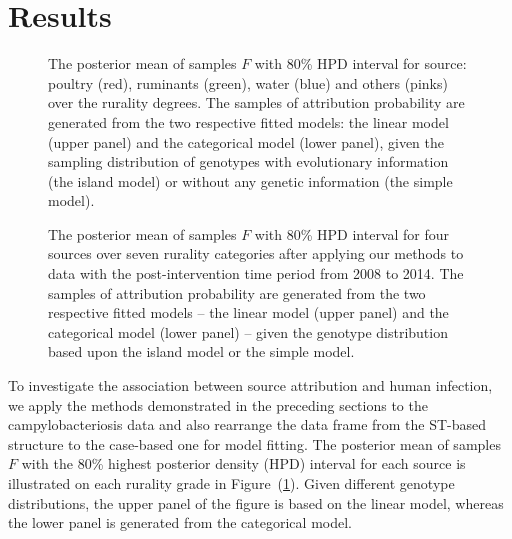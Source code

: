 \documentclass[times, doublespace]{WileyNJD-v2}%
\begin{document}
\section{Results}

\begin{figure}
\centering
\caption{The posterior mean of samples $F$ with 80\% HPD interval for source: poultry (red), ruminants (green), water (blue) and others (pinks) over the rurality degrees. The samples of attribution probability are generated from the two respective fitted models: the linear model (upper panel) and the categorical model (lower panel), given the sampling distribution of genotypes with evolutionary information (the island model) or without any genetic information (the simple model).}
\label{fig2}
\end{figure}

\begin{figure}
\centering
\caption{The posterior mean of samples $F$ with 80\% HPD interval for four sources over seven rurality categories after applying our methods to data with the post-intervention time period from 2008 to 2014. The samples of attribution probability are generated from the two respective fitted models -- the linear model (upper panel) and the categorical model (lower panel) -- given the genotype distribution based upon the island model or the simple model.}
\label{fig3}
\end{figure}

To investigate the association between source attribution and human infection, we apply the methods demonstrated in the preceding sections to the campylobacteriosis data and also rearrange the data frame from the ST-based structure to the case-based one for model fitting. The posterior mean of samples $F$ with the 80\% highest posterior density (HPD) interval for each source is illustrated on each rurality grade in Figure~(\ref{fig2}). Given different genotype distributions, the upper panel of the figure is based on the linear model, whereas the lower panel is generated from the categorical model.
\end{document}
